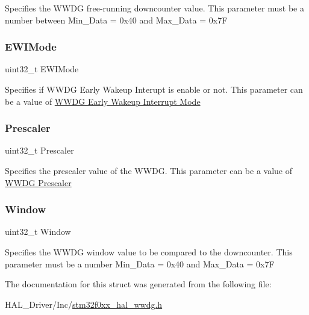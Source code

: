 Specifies the W\+W\+DG free-\/running downcounter value. This parameter must be a number between Min\+\_\+\+Data = 0x40 and Max\+\_\+\+Data = 0x7F \mbox{\label{struct_w_w_d_g___init_type_def_a1df23879272edb779395505a505eb0c3}} 
\subsubsection{\texorpdfstring{E\+W\+I\+Mode}{EWIMode}}
{\footnotesize\ttfamily uint32\+\_\+t E\+W\+I\+Mode}

Specifies if W\+W\+DG Early Wakeup Interupt is enable or not. This parameter can be a value of \hyperlink{group___w_w_d_g___e_w_i___mode}{W\+W\+DG Early Wakeup Interrupt Mode} \mbox{\label{struct_w_w_d_g___init_type_def_affb82025da5b8d4a06e61f1690460f4d}} 
\subsubsection{\texorpdfstring{Prescaler}{Prescaler}}
{\footnotesize\ttfamily uint32\+\_\+t Prescaler}

Specifies the prescaler value of the W\+W\+DG. This parameter can be a value of \hyperlink{group___w_w_d_g___prescaler}{W\+W\+DG Prescaler} \mbox{\label{struct_w_w_d_g___init_type_def_a0ea3a5767370dd42e6108643f23d5c68}} 
\subsubsection{\texorpdfstring{Window}{Window}}
{\footnotesize\ttfamily uint32\+\_\+t Window}

Specifies the W\+W\+DG window value to be compared to the downcounter. This parameter must be a number Min\+\_\+\+Data = 0x40 and Max\+\_\+\+Data = 0x7F 

The documentation for this struct was generated from the following file\+:\begin{DoxyCompactItemize}
\item 
H\+A\+L\+\_\+\+Driver/\+Inc/\hyperlink{stm32f0xx__hal__wwdg_8h}{stm32f0xx\+\_\+hal\+\_\+wwdg.\+h}\end{DoxyCompactItemize}
